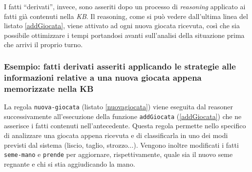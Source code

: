 I fatti ``derivati'', invece, sono asseriti dopo un processo di \emph{reasoning} applicato ai fatti già contenuti nella \emph{KB}.
Il reasoning, come si può vedere dall'ultima linea del listato \ref{addGiocata}, viene attivato ad ogni nuova giocata ricevuta, così che sia possibile ottimizzare i tempi portandosi avanti sull'analisi della situazione prima che arrivi il proprio turno.\\

\subsubsection*{Esempio: fatti derivati asseriti applicando le strategie alle informazioni relative a una nuova giocata appena memorizzate nella KB}

La regola \texttt{nuova-giocata} (listato \ref{nuovagiocata}) viene eseguita dal reasoner successivamente all'esecuzione della funzione \texttt{addGiocata} (\ref{addGiocata}) che ne asserisce i fatti contenuti nell'antecedente.
Questa regola permette nello specifico di analizzare una giocata appena ricevuta e di classificarla in uno dei modi previsti dal sistema (liscio, taglio, strozzo...).
Vengono inoltre modificati i fatti \texttt{seme-mano} e \texttt{prende} per aggiornare, rispettivamente, quale sia il nuovo seme regnante e chi si stia aggiudicando la mano.




